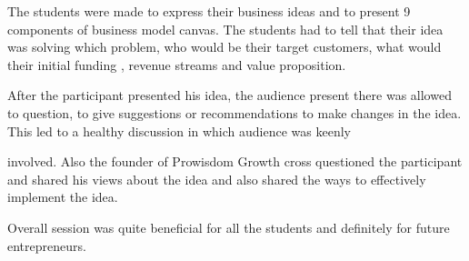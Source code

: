 \documentclass[12pt, a4 paper]{article}
\begin{document}
\begin{center}
\begin{Large}
\newpage 


\begin{multicols}{2}
The students were made to express their business ideas and to present 9 components of business model canvas. The students had to tell that their idea was solving which problem, who would be their target customers, what would their initial funding , revenue streams and value proposition.

\columnbreak
  
\end{multicols}

\begin{multicols}{2}

\columnbreak
After the participant presented his idea, the audience present there was allowed to question, to give suggestions or recommendations to make changes in the idea. This led to a healthy discussion in which audience was keenly

  
\end{multicols} 

\begin{multicols}{2}
involved. Also the founder of Prowisdom Growth cross questioned the participant and shared his views about the idea and also shared the ways to effectively implement the idea.


\columnbreak
  
\end{multicols} 

\begin{multicols}{2}

\columnbreak
Overall session was quite beneficial for all the students and definitely for future entrepreneurs.
   
\end{multicols} 

\end{Large} 
\end{center}

\newpage 

\end{document}
